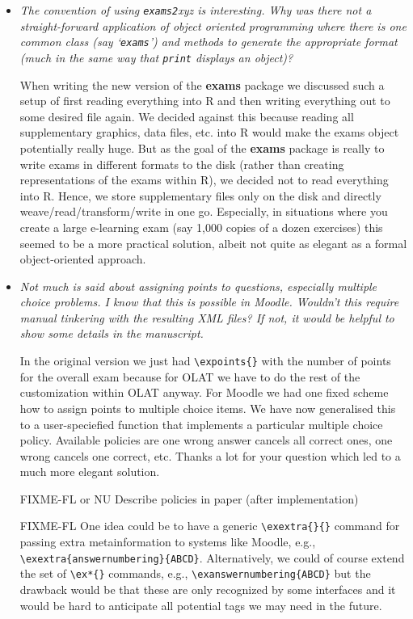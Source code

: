 \documentclass[a4paper]{article}
\begin{document}
\begin{itemize}

\item {\it
The convention of using \texttt{exams2}xyz is interesting. Why was there not a
straight-forward application of object oriented programming where there is
one common class (say `\texttt{exams}') and methods to generate the appropriate
format (much in the same way that \texttt{print} displays an object)?}

When writing the new version of the \textbf{exams} package we discussed such a setup
of first reading everything into R and then writing everything out to some
desired file again. We decided against this because reading all supplementary
graphics, data files, etc. into R would make the exams object potentially
really huge. But as the goal of the \textbf{exams} package is really to write exams
in different formats to the disk (rather than creating representations of the
exams within R), we decided not to read everything into R. Hence, we store
supplementary files only on the disk and directly weave/read/transform/write
in one go. Especially, in situations where you create a large e-learning exam
(say 1,000 copies of a dozen exercises) this seemed to be a more practical
solution, albeit not quite as elegant as a formal object-oriented approach.
 
\item {\it
Not much is said about assigning points to questions, especially
multiple choice problems. I know that this is possible in Moodle. Wouldn't
this require manual tinkering with the resulting XML files? If not, it
would be helpful to show some details in the manuscript.}

In the original version we just had \verb|\expoints{}| with the number of
points for the overall exam because for OLAT we have to do the rest of
the customization within OLAT anyway. For Moodle we had one fixed
scheme how to assign points to multiple choice items. We have now
generalised this to a user-speciefied function that implements a
particular multiple choice policy. Available policies are one wrong
answer cancels all correct ones, one wrong cancels one correct,
etc. Thanks a lot for your question which led to a much more elegant
solution.

FIXME-FL or NU
Describe policies in paper (after implementation)

FIXME-FL
One idea could be to have a generic \verb|\exextra{}{}| command for passing extra
metainformation to systems like Moodle, e.g., \verb|\exextra{answernumbering}{ABCD}|.
Alternatively, we could of course extend the set of \verb|\ex*{}| commands, e.g.,
\verb|\exanswernumbering{ABCD}| but the drawback would be that these are only recognized
by some interfaces and it would be hard to anticipate all potential tags
we may need in the future.


\end{itemize}
\end{document}
